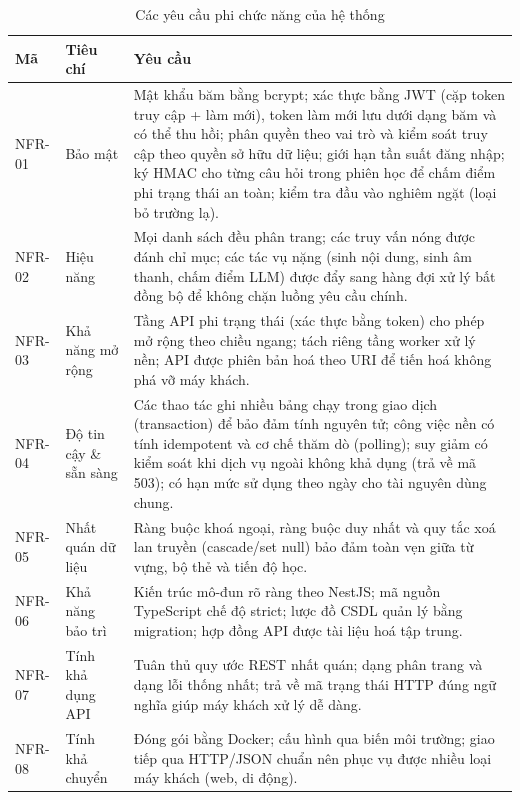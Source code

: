 \begin{table}[h]
  \centering
  \small
  \renewcommand{\arraystretch}{1.3}
  \begin{tabular}{|p{1.5cm}|p{3.0cm}|p{10.0cm}|}
    \hline
    \textbf{Mã} & \textbf{Tiêu chí} & \textbf{Yêu cầu} \\
    \hline
    NFR-01 & Bảo mật & Mật khẩu băm bằng bcrypt; xác thực bằng JWT (cặp token truy cập + làm mới), token làm mới lưu dưới dạng băm và có thể thu hồi; phân quyền theo vai trò và kiểm soát truy cập theo quyền sở hữu dữ liệu; giới hạn tần suất đăng nhập; ký HMAC cho từng câu hỏi trong phiên học để chấm điểm phi trạng thái an toàn; kiểm tra đầu vào nghiêm ngặt (loại bỏ trường lạ). \\
    \hline
    NFR-02 & Hiệu năng & Mọi danh sách đều phân trang; các truy vấn nóng được đánh chỉ mục; các tác vụ nặng (sinh nội dung, sinh âm thanh, chấm điểm LLM) được đẩy sang hàng đợi xử lý bất đồng bộ để không chặn luồng yêu cầu chính. \\
    \hline
    NFR-03 & Khả năng mở rộng & Tầng API phi trạng thái (xác thực bằng token) cho phép mở rộng theo chiều ngang; tách riêng tầng worker xử lý nền; API được phiên bản hoá theo URI để tiến hoá không phá vỡ máy khách. \\
    \hline
    NFR-04 & Độ tin cậy \& sẵn sàng & Các thao tác ghi nhiều bảng chạy trong giao dịch (transaction) để bảo đảm tính nguyên tử; công việc nền có tính idempotent và cơ chế thăm dò (polling); suy giảm có kiểm soát khi dịch vụ ngoài không khả dụng (trả về mã 503); có hạn mức sử dụng theo ngày cho tài nguyên dùng chung. \\
    \hline
    NFR-05 & Nhất quán dữ liệu & Ràng buộc khoá ngoại, ràng buộc duy nhất và quy tắc xoá lan truyền (cascade/set null) bảo đảm toàn vẹn giữa từ vựng, bộ thẻ và tiến độ học. \\
    \hline
    NFR-06 & Khả năng bảo trì & Kiến trúc mô-đun rõ ràng theo NestJS; mã nguồn TypeScript chế độ strict; lược đồ CSDL quản lý bằng migration; hợp đồng API được tài liệu hoá tập trung. \\
    \hline
    NFR-07 & Tính khả dụng API & Tuân thủ quy ước REST nhất quán; dạng phân trang và dạng lỗi thống nhất; trả về mã trạng thái HTTP đúng ngữ nghĩa giúp máy khách xử lý dễ dàng. \\
    \hline
    NFR-08 & Tính khả chuyển & Đóng gói bằng Docker; cấu hình qua biến môi trường; giao tiếp qua HTTP/JSON chuẩn nên phục vụ được nhiều loại máy khách (web, di động). \\
    \hline
  \end{tabular}
  \caption{Các yêu cầu phi chức năng của hệ thống}
  \label{tab:nfr}
\end{table}

